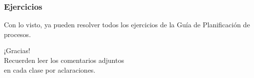 \documentclass[aspectratio=169]{beamer}
\begin{document}
\begin{frame}[fragile]
    \frametitle{Ejercicios}
    \vfill
    Con lo visto, ya pueden resolver todos los ejercicios de la Guía de Planificación de procesos.
    \vfill
\end{frame}

\begin{frame}[plain]
    \begin{center}
    \vspace{2cm}
    \huge ¡Gracias!\\
    \vspace{2cm}
    \normalsize Recuerden leer los comentarios adjuntos\\ en cada clase por aclaraciones.
    \end{center}
\end{frame}
\end{document}
